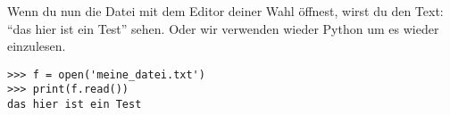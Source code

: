 Wenn du nun die Datei mit dem Editor deiner Wahl öffnest, wirst du den Text: ``das hier ist ein Test'' sehen. Oder wir verwenden wieder Python um es wieder einzulesen.

\begin{Verbatim}[frame=single]
>>> f = open('meine_datei.txt')
>>> print(f.read())
das hier ist ein Test

\end{Verbatim}

\newpage
